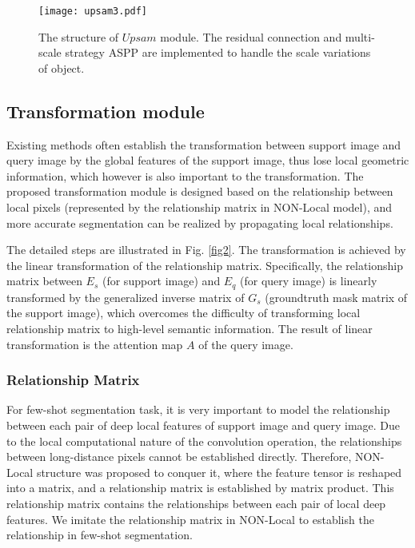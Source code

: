 \documentclass[runningheads]{llncs}
\begin{document}
\begin{figure}
\texttt{[image: upsam3.pdf]}
\caption{The structure of $Upsam$ module. The residual connection\cite{ref_resnet} and multi-scale strategy ASPP\cite{ref_crfv1} are implemented to handle the scale variations of object.} \label{fig3}
\end{figure}

\subsection{Transformation module}\label{section_tran}
Existing methods often establish the transformation between support image and query image by the global features of the support image, thus lose local geometric information, which however is also important to the transformation. The proposed transformation module is designed based on the relationship between local pixels (represented by the relationship matrix in NON-Local model\cite{ref_non_local}), and more accurate segmentation can be realized by propagating local relationships. 



The detailed steps are illustrated in Fig. \ref{fig2}. The transformation is achieved by the linear transformation of the relationship matrix. Specifically, the relationship matrix between $E_s$ (for support image) and $E_q$ (for query image) is linearly transformed by the generalized inverse matrix of $G_s$ (groundtruth mask matrix of the support image), which overcomes the difficulty of transforming local relationship matrix to high-level semantic information. The result of linear transformation is the attention map $A$ of the query image.

\subsubsection{Relationship Matrix}

For few-shot segmentation task, it is very important to model the relationship between each pair of deep local features of support image and query image. Due to the local computational nature of the convolution operation, the relationships between long-distance pixels cannot be established directly. 
Therefore, NON-Local\cite{ref_non_local} structure was proposed to conquer it,
where the feature tensor is reshaped into a matrix, and a relationship matrix is established by matrix product. This relationship matrix contains the relationships between each pair of local deep features.  We imitate the relationship matrix in NON-Local\cite{ref_non_local} to establish the relationship in few-shot segmentation.
\end{document}
